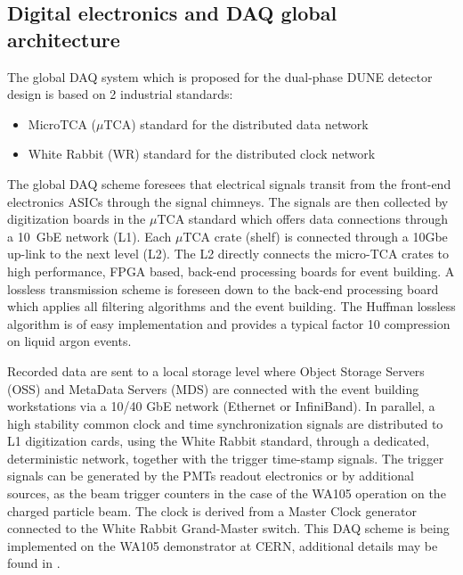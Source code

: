\subsection{Digital electronics and DAQ global architecture}

The global DAQ system which is proposed for the dual-phase DUNE
detector design is based on 2 industrial standards:
\begin{itemize}
\item MicroTCA ($\mu$TCA) standard for the distributed data network \cite{mTCA-standard}
\item White Rabbit (WR) standard for the distributed clock network \cite{WR-standard}
\end{itemize}

The global DAQ scheme foresees that electrical signals transit from
the front-end electronics ASICs through the signal chimneys. The
signals are then collected by digitization boards in the $\mu$TCA
standard which offers data connections through a 10~GbE network
(L1). Each $\mu$TCA crate (shelf) is connected through a 10Gbe up-link
to the next level (L2). The L2 directly connects the micro-TCA crates
to high performance, FPGA based, back-end processing boards for event
building. A lossless transmission scheme is foreseen down to the
back-end processing board which applies all filtering algorithms and
the event building. The Huffman lossless algorithm is of easy
implementation and provides a typical factor 10 compression on liquid
argon events.

Recorded data are sent to a local storage level where Object Storage
Servers (OSS) and MetaData Servers (MDS) are connected with the event
building workstations via a 10/40 GbE network (Ethernet or
InfiniBand). In parallel, a high stability common clock and time
synchronization signals are distributed to L1 digitization cards,
using the White Rabbit standard, through a dedicated, deterministic
network, together with the trigger time-stamp signals. The trigger
signals can be generated by the PMTs readout electronics or by
additional sources, as the beam trigger counters in the case of the
WA105 operation on the charged particle beam. The clock is derived
from a Master Clock generator connected to the White Rabbit
Grand-Master switch. This DAQ scheme is being implemented on the WA105
demonstrator at CERN, additional details may be found in
\cite{WA105_TDR}.

